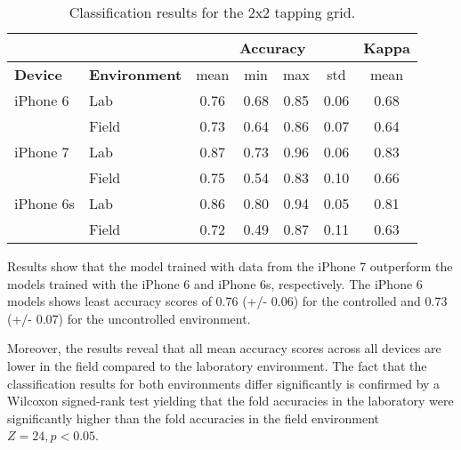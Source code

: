 \begin{table}[h!]
  \centering
\begin{tabular}{|l|l|c|c|c|c|c|}
  \cline{3-7}
  \multicolumn{2}{c}{} & \multicolumn{4}{|c|}{\textbf{Accuracy}} & \textbf{Kappa} \\
  \hline
  \textbf{Device} & \textbf{Environment} & mean &   min &   max  & std &  mean \\
  \hline
  iPhone 6 & Lab &      0.76 &     0.68 &     0.85 &     0.06 &        0.68 \\
  & Field &      0.73 &     0.64 &     0.86 &     0.07 &        0.64 \\
  \hline
iPhone 7 & Lab &      0.87 &     0.73 &     0.96 &     0.06 &        0.83 \\
  & Field &      0.75 &     0.54 &     0.83 &     0.10 &        0.66 \\
  \hline
iPhone 6s & Lab &      0.86 &     0.80 &     0.94 &     0.05 &        0.81 \\
  & Field &      0.72 &     0.49 &     0.87 &     0.11 &        0.63 \\
  \hline
\end{tabular}
  \caption{Classification results for the 2x2 tapping grid.}
\end{table}

Results show that the model trained with data from the iPhone 7 outperform the models trained with the iPhone 6 and iPhone 6s, respectively. The iPhone 6 models shows least accuracy scores of 0.76 (+/- 0.06) for the controlled and 0.73 (+/- 0.07) for the uncontrolled environment.


Moreover, the results reveal that all mean accuracy scores across all devices are lower in the field compared to the laboratory environment. The fact that the classification results for both environments differ significantly is confirmed by a Wilcoxon signed-rank test yielding that the fold accuracies in the laboratory were significantly higher than the fold accuracies in the field environment $Z = 24, p < 0.05$.

